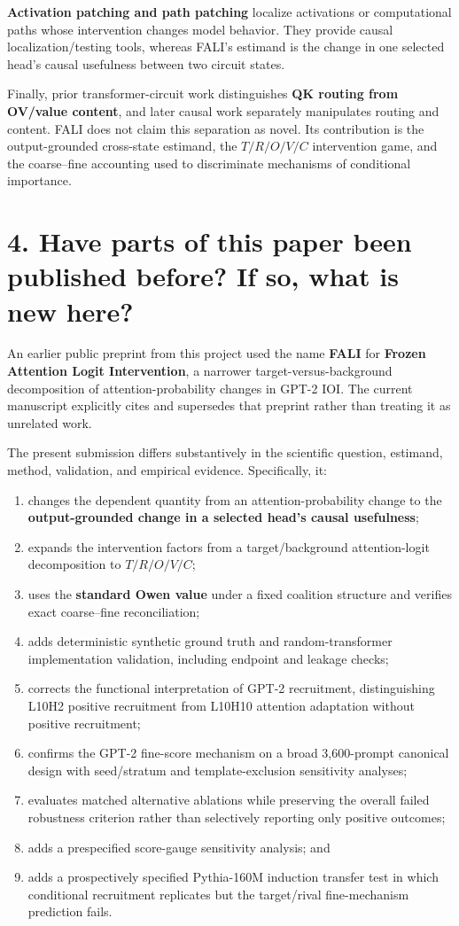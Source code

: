 \documentclass[10pt]{article}
\begin{document}
\textbf{Activation patching and path patching} localize activations or computational paths whose intervention changes model behavior. They provide causal localization/testing tools, whereas FALI's estimand is the change in one selected head's causal usefulness between two circuit states.

Finally, prior transformer-circuit work distinguishes \textbf{QK routing from OV/value content}, and later causal work separately manipulates routing and content. FALI does not claim this separation as novel. Its contribution is the output-grounded cross-state estimand, the $T/R/O/V/C$ intervention game, and the coarse--fine accounting used to discriminate mechanisms of conditional importance.

\section*{4. Have parts of this paper been published before? If so, what is new here?}

An earlier public preprint from this project used the name \textbf{FALI} for \textbf{Frozen Attention Logit Intervention}, a narrower target-versus-background decomposition of attention-probability changes in GPT-2 IOI. The current manuscript explicitly cites and supersedes that preprint rather than treating it as unrelated work.

The present submission differs substantively in the scientific question, estimand, method, validation, and empirical evidence. Specifically, it:

\begin{enumerate}
\item changes the dependent quantity from an attention-probability change to the \textbf{output-grounded change in a selected head's causal usefulness};
\item expands the intervention factors from a target/background attention-logit decomposition to \textbf{$T/R/O/V/C$};
\item uses the \textbf{standard Owen value} under a fixed coalition structure and verifies exact coarse--fine reconciliation;
\item adds deterministic synthetic ground truth and random-transformer implementation validation, including endpoint and leakage checks;
\item corrects the functional interpretation of GPT-2 recruitment, distinguishing L10H2 positive recruitment from L10H10 attention adaptation without positive recruitment;
\item confirms the GPT-2 fine-score mechanism on a broad 3,600-prompt canonical design with seed/stratum and template-exclusion sensitivity analyses;
\item evaluates matched alternative ablations while preserving the overall failed robustness criterion rather than selectively reporting only positive outcomes;
\item adds a prespecified score-gauge sensitivity analysis; and
\item adds a prospectively specified Pythia-160M induction transfer test in which conditional recruitment replicates but the target/rival fine-mechanism prediction fails.
\end{enumerate}
\end{document}
